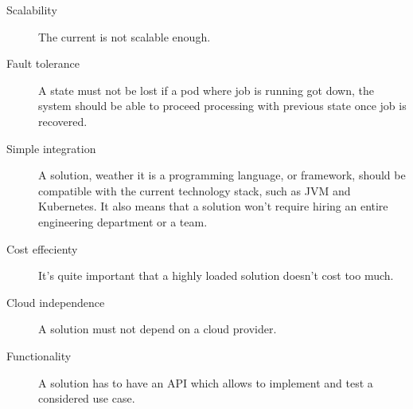 \begin{description}
    \item[Scalability] The current is not scalable enough.
    \item[Fault tolerance] A state must not be lost if a pod where job is running got down,
    the system should be able to proceed processing with previous state once job is recovered.
    \item[Simple integration] A solution, weather it is a programming language,
    or framework, should be compatible with the current technology stack, such as JVM and Kubernetes.
    It also means that a solution won't require hiring an entire engineering department or a team.
    \item[Cost effecienty] It's quite important that a highly loaded solution doesn't cost too much.
    \item[Cloud independence] A solution must not depend on a cloud provider.
    \item[Functionality] A solution has to have an API which allows to implement and test a considered use case.
\end{description}


